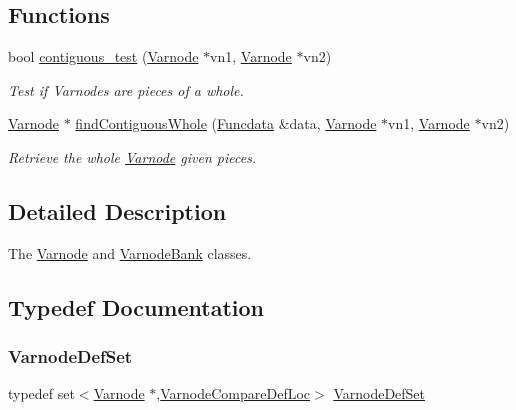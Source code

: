 \subsection*{Functions}
\begin{DoxyCompactItemize}
\item 
bool \mbox{\hyperlink{varnode_8hh_a4fd41aa3b524032766add2e4bdd5cd5c}{contiguous\+\_\+test}} (\mbox{\hyperlink{class_varnode}{Varnode}} $\ast$vn1, \mbox{\hyperlink{class_varnode}{Varnode}} $\ast$vn2)
\begin{DoxyCompactList}\small\item\em Test if Varnodes are pieces of a whole. \end{DoxyCompactList}\item 
\mbox{\hyperlink{class_varnode}{Varnode}} $\ast$ \mbox{\hyperlink{varnode_8hh_a242908161787e2bdd0d8fbfb2069f8d9}{find\+Contiguous\+Whole}} (\mbox{\hyperlink{class_funcdata}{Funcdata}} \&data, \mbox{\hyperlink{class_varnode}{Varnode}} $\ast$vn1, \mbox{\hyperlink{class_varnode}{Varnode}} $\ast$vn2)
\begin{DoxyCompactList}\small\item\em Retrieve the whole \mbox{\hyperlink{class_varnode}{Varnode}} given pieces. \end{DoxyCompactList}\end{DoxyCompactItemize}


\subsection{Detailed Description}
The \mbox{\hyperlink{class_varnode}{Varnode}} and \mbox{\hyperlink{class_varnode_bank}{Varnode\+Bank}} classes. 



\subsection{Typedef Documentation}
\mbox{\label{varnode_8hh_abf628bb127fd09a80a956b3fd54e61ff}} 
\subsubsection{\texorpdfstring{VarnodeDefSet}{VarnodeDefSet}}
{\footnotesize\ttfamily typedef set$<$\mbox{\hyperlink{class_varnode}{Varnode}} $\ast$,\mbox{\hyperlink{struct_varnode_compare_def_loc}{Varnode\+Compare\+Def\+Loc}}$>$ \mbox{\hyperlink{varnode_8hh_abf628bb127fd09a80a956b3fd54e61ff}{Varnode\+Def\+Set}}}



